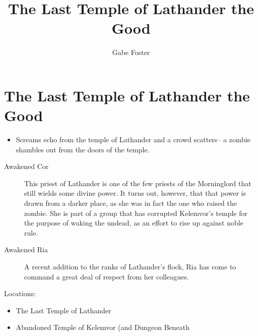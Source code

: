 \documentclass[11pt]{article}
\theoremstyle{definition}
\theoremstyle{remark}
\begin{document}
	\title{The Last Temple of Lathander the Good}
	\date{\vspace{-24pt}}
	\author{Gabe Foster}
	\maketitle

\section{The Last Temple of Lathander the Good}

\begin{description}

\item[Hooks:] 

\begin{itemize}

\item{Screams echo from the temple of Lathander and a crowd scatters-- a zombie shambles out from the doors of the temple.}

\end{itemize}

\item[NPCs:]
\begin{description}

\item[Awakened Cor] This priest of Lathander is one of the few priests of the Morninglord that still wields some divine power.  It turns out, however, that that power is drawn from a darker place, as she was in fact the one who raised the zombie. She is part of a group that has corrupted Kelemvor's temple for the purpose of waking the undead, as an effort to rise up against noble rule. 

\item[Awakened Ria]

A recent addition to the ranks of Lathander's flock, Ria has come to command a great deal of respect from her colleagues.  

\end{description}

\item{Locations:}

\begin{itemize}

\item{The Last Temple of Lathander}

\item{Abandoned Temple of Kelemvor (and Dungeon Beneath}

\end{itemize}

\end{description}
\end{document}

